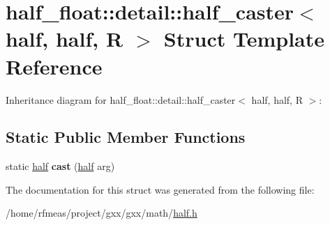 \hypertarget{structhalf__float_1_1detail_1_1half__caster_3_01half_00_01half_00_01R_01_4}{}\section{half\+\_\+float\+:\+:detail\+:\+:half\+\_\+caster$<$ half, half, R $>$ Struct Template Reference}
\label{structhalf__float_1_1detail_1_1half__caster_3_01half_00_01half_00_01R_01_4}


Inheritance diagram for half\+\_\+float\+:\+:detail\+:\+:half\+\_\+caster$<$ half, half, R $>$\+:
\subsection*{Static Public Member Functions}
\begin{DoxyCompactItemize}
\item 
static \hyperlink{classhalf__float_1_1half}{half} {\bfseries cast} (\hyperlink{classhalf__float_1_1half}{half} arg)\hypertarget{structhalf__float_1_1detail_1_1half__caster_3_01half_00_01half_00_01R_01_4_afaaa63731da3198dc70a01cd784ac078}{}\label{structhalf__float_1_1detail_1_1half__caster_3_01half_00_01half_00_01R_01_4_afaaa63731da3198dc70a01cd784ac078}

\end{DoxyCompactItemize}


The documentation for this struct was generated from the following file\+:\begin{DoxyCompactItemize}
\item 
/home/rfmeas/project/gxx/gxx/math/\hyperlink{half_8h}{half.\+h}\end{DoxyCompactItemize}
